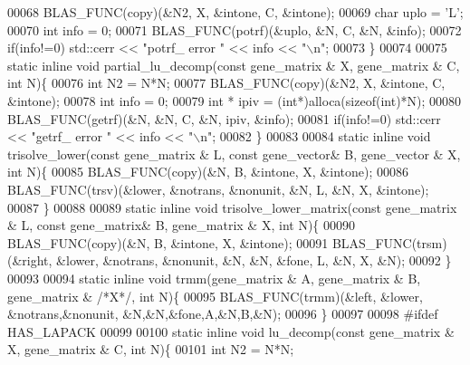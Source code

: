 \begin{DoxyCode}
00068     BLAS\_FUNC(copy)(&N2, X, &intone, C, &intone);
00069     \textcolor{keywordtype}{char} uplo = \textcolor{charliteral}{'L'};
00070     \textcolor{keywordtype}{int} info = 0;
00071     BLAS\_FUNC(potrf)(&uplo, &N, C, &N, &info);
00072     \textcolor{keywordflow}{if}(info!=0) std::cerr << \textcolor{stringliteral}{"potrf\_ error "} << info << \textcolor{stringliteral}{"\(\backslash\)n"};
00073   \}
00074 
00075   \textcolor{keyword}{static} \textcolor{keyword}{inline} \textcolor{keywordtype}{void} partial\_lu\_decomp(\textcolor{keyword}{const} gene\_matrix & X, gene\_matrix & C, \textcolor{keywordtype}{int} N)\{
00076     \textcolor{keywordtype}{int} N2 = N*N;
00077     BLAS\_FUNC(copy)(&N2, X, &intone, C, &intone);
00078     \textcolor{keywordtype}{int} info = 0;
00079     \textcolor{keywordtype}{int} * ipiv = (\textcolor{keywordtype}{int}*)alloca(\textcolor{keyword}{sizeof}(\textcolor{keywordtype}{int})*N);
00080     BLAS\_FUNC(getrf)(&N, &N, C, &N, ipiv, &info);
00081     \textcolor{keywordflow}{if}(info!=0) std::cerr << \textcolor{stringliteral}{"getrf\_ error "} << info << \textcolor{stringliteral}{"\(\backslash\)n"};
00082   \}
00083   
00084   \textcolor{keyword}{static} \textcolor{keyword}{inline} \textcolor{keywordtype}{void} trisolve\_lower(\textcolor{keyword}{const} gene\_matrix & L, \textcolor{keyword}{const} gene\_vector& B, gene\_vector & X, \textcolor{keywordtype}{int} N)\{
00085     BLAS\_FUNC(copy)(&N, B, &intone, X, &intone);
00086     BLAS\_FUNC(trsv)(&lower, &notrans, &nonunit, &N, L, &N, X, &intone);
00087   \}
00088 
00089   \textcolor{keyword}{static} \textcolor{keyword}{inline} \textcolor{keywordtype}{void} trisolve\_lower\_matrix(\textcolor{keyword}{const} gene\_matrix & L, \textcolor{keyword}{const} gene\_matrix& B, gene\_matrix & X, \textcolor{keywordtype}{
      int} N)\{
00090     BLAS\_FUNC(copy)(&N, B, &intone, X, &intone);
00091     BLAS\_FUNC(trsm)(&right, &lower, &notrans, &nonunit, &N, &N, &fone, L, &N, X, &N);
00092   \}
00093 
00094   \textcolor{keyword}{static} \textcolor{keyword}{inline} \textcolor{keywordtype}{void} trmm(gene\_matrix & A, gene\_matrix & B, gene\_matrix & \textcolor{comment}{/*X*/}, \textcolor{keywordtype}{int} N)\{
00095     BLAS\_FUNC(trmm)(&left, &lower, &notrans,&nonunit, &N,&N,&fone,A,&N,B,&N);
00096   \}
00097 
00098 \textcolor{preprocessor}{  #ifdef HAS\_LAPACK}
00099 
00100   \textcolor{keyword}{static} \textcolor{keyword}{inline} \textcolor{keywordtype}{void} lu\_decomp(\textcolor{keyword}{const} gene\_matrix & X, gene\_matrix & C, \textcolor{keywordtype}{int} N)\{
00101     \textcolor{keywordtype}{int} N2 = N*N;

\end{DoxyCode}
